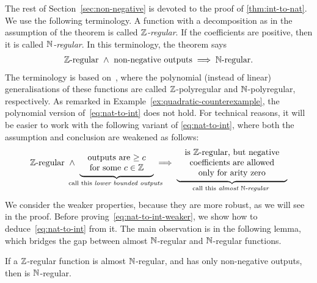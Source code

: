 The rest of Section~\ref{sec:non-negative} is devoted to the proof of \cref{thm:int-to-nat}. We use the following terminology. A function with a decomposition as in the assumption of the theorem is called \emph{${\mathbb Z}$-regular}. If the coefficients are positive, then it is called \emph{${\mathbb N}$-regular}. In this terminology, the theorem says 
\begin{align}\label{eq:nat-to-int}
\text{${\mathbb Z}$-regular} \ \land \ \text{non-negative outputs} \implies \text{${\mathbb N}$-regular}.
\end{align}
The terminology is based on~\cite{Zpolyreg23}, where the polynomial (instead of linear) generalisations of these functions are called ${\mathbb Z}$-polyregular and ${\mathbb N}$-polyregular, respectively. As remarked in Example~\ref{ex:quadratic-counterexample}, the polynomial version of~\eqref{eq:nat-to-int} does not hold.
For technical reasons, it will be easier to work with the following variant of \eqref{eq:nat-to-int}, where both the assumption and conclusion are weakened as follows: 
\begin{align}\label{eq:nat-to-int-weaker}
\text{$\Int$-regular} \ \land \ 
\myunderbrace{\text{
\begin{tabular}{c}
        outputs are $\ge c$ \\ 
        for some $c \in \Int$
    \end{tabular}
}}{call this \emph{lower bounded outputs}}
 \implies 
 \myunderbrace{\text{
\begin{tabular}{c}
        is $\Int$-regular, but  negative \\ coefficients are allowed \\
        only for arity zero
    \end{tabular}
}}{call this \emph{almost $\Nat$-regular}}
\end{align}
We consider the weaker properties, because they are more robust, as we will see in the proof. Before proving~\eqref{eq:nat-to-int-weaker}, we show how to deduce~\eqref{eq:nat-to-int} from it. The main observation is in the following lemma, which bridges the gap between almost ${\mathbb N}$-regular and ${\mathbb N}$-regular functions.



        \begin{lemma}\label{lem:remove-almost}
            If a  ${\mathbb Z}$-regular function  is almost ${\mathbb N}$-regular, and has only non-negative outputs, then  is ${\mathbb N}$-regular.
    \end{lemma}

